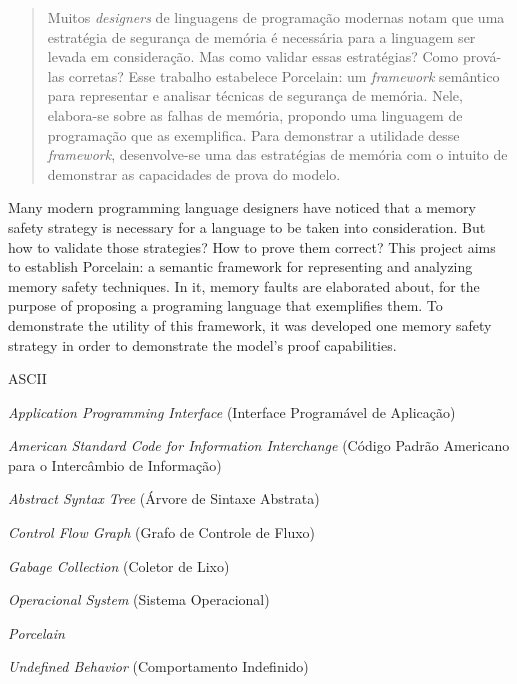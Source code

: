 \documentclass[cic,tc]{iiufrgs}
\begin{document}
\begin{abstract}
	Muitos \emph{designers} de linguagens de programação modernas notam que uma estratégia de segurança de memória é necessária para a linguagem ser levada em consideração. Mas como validar essas estratégias? Como prová-las corretas? Esse trabalho estabelece Porcelain: um \emph{framework} semântico para representar e analisar técnicas de segurança de memória. Nele, elabora-se sobre as falhas de memória, propondo uma linguagem de programação que as exemplifica. Para demonstrar a utilidade desse \emph{framework}, desenvolve-se uma das estratégias de memória com o intuito de demonstrar as capacidades de prova do modelo.
\end{abstract}

\begin{translatedabstract}
Many modern programming language designers have noticed that a memory safety strategy is necessary for a language to be taken into consideration. But how to validate those strategies? How to prove them correct? This project aims to establish Porcelain: a semantic framework for representing and analyzing memory safety techniques. In it, memory faults are elaborated about, for the purpose of proposing a programing language that exemplifies them. To demonstrate the utility of this framework, it was developed one memory safety strategy in order to demonstrate the model's proof capabilities.
\end{translatedabstract}

\listoffigures

\listoftables

\begin{listofabbrv}{ASCII}
    \item[API] \emph{Application Programming Interface} (Interface Programável de Aplicação)
	\item[ASCII] \emph{American Standard Code for Information Interchange} (Código Padrão Americano para o Intercâmbio de Informação)
    \item[AST] \emph{Abstract Syntax Tree} (Árvore de Sintaxe Abstrata)
    \item[CFG] \emph{Control Flow Graph} (Grafo de Controle de Fluxo)
    \item[GC] \emph{Gabage Collection} (Coletor de Lixo)
    \item[OS] \emph{Operacional System} (Sistema Operacional)
    \item[PCL] \emph{Porcelain}
    \item[UB] \emph{Undefined Behavior} (Comportamento Indefinido)
\end{listofabbrv}
\end{document}
